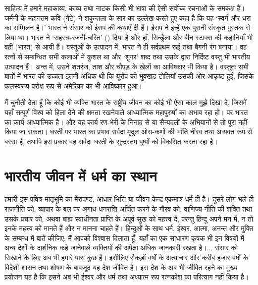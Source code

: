 साहित्य में हमारे महाकाव्य, काव्य तथा नाटक किसी भी भाषा की ऐसी सर्वोच्च रचनाओं के समकक्ष हैं। जर्मनी के महानतम कवि (गेटे) ने शकुन्तला के सार का उल्लेख करते हुए कहा है कि यह ‘स्वर्ग और धरा का सम्मिलन है।’ भारत ने संसार को ईसप की कथाएँ दी हैं। ईसप ने इन्हें एक पुरानी संस्कृत पुस्तक से लिया था। भारत ने ‘सहस्त्र-रजनी-चरित’ () दिया है और हाँ, सिन्ड्रैला और बीन स्टाक्स की कहानियाँ भी वहीं (भारत) से आयी हैं। वस्तुओं के उत्पादन में, भारत ने ही सर्वप्रथम रूई तथा बैगनी रंग बनाया। वह रत्नों से सम्बन्धित सभी कलाओं में कुशल था और ‘शुगर’ शब्द तथा उसके द्वारा निर्दिष्ट वस्तु भी भारतीय उत्पादन हैं। अन्त में, उसने शतरंज, ताश और चौपड़ के खेलों का आविष्कार भी किया है। वस्तुतः सभी बातों में भारत की उच्चता इतनी अधिक थी कि यूरोप की भुक्खड़ टोलियाँ उसकी ओर आकृष्ट हुईं, जिसके फलस्वरूप परोक्ष रूप से अमेरिका का भी आविष्कार हुआ। 

मैं चुनौती देता हूँ कि कोई भी व्यक्ति भारत के राष्ट्रीय जीवन का कोई भी ऐसा काल मुझे दिखा दे, जिसमें यहाँ सम्पूर्ण विश्व को हिला देने की क्षमता रखनेवाले आध्यात्मिक महापुरुषों का अभाव रहा हो। पर भारत का कार्य आध्यात्मिक है। और यह कार्य रण-भेरी के निनाद से या सैन्यदलों के अभियानों से तो पूरा नहीं किया जा सकता। धरती पर भारत का प्रभाव सर्वदा मृदुल ओस-कणों की भाँति नीरव तथा अव्यक्त रूप से बरसा है, तथापि इस प्रकार वह सर्वदा धरती के सुन्दरतम पुष्पों को विकसित करता रहा है।


\section*{भारतीय जीवन में धर्म का स्थान}


हमारी इस पवित्र मातृभूमि का मेरुदण्ड, आधार-भित्ति या जीवन-केन्द्र एकमात्र धर्म ही है। दूसरे लोग भले ही राजनीति को, व्यापार के बल पर अगाध धनराशि अर्जित करने के गौरव को, वाणिज्य-नीति की शक्ति तथा उसके प्रचार को, अथवा बाह्य स्वाधीनता प्राप्ति के अपूर्व सुख को महत्त्व दें, परन्तु हिन्दू अपने मन में, न तो इनके महत्त्व को मानते हैं और न मानना चाहते हैं। हिन्दुओं के साथ धर्म, ईश्वर, आत्मा, अनन्त और मुक्ति के सम्बन्ध में बातें कीजिए; मैं आपको विश्वास दिलाता हूँ, यहाँ का एक साधारण कृषक भी इन विषयों में अन्य देशों के दार्शनिक कहे जानेवाले व्यक्तियों की अपेक्षा अधिक जानकारी रखता है।... संसार को सिखाने के लिए अब भी हमारे पास कुछ है। इसीलिए सैकड़ों वर्षों के अत्याचार और करीब हजार वर्षों के विदेशी शासन तथा शोषण के बावजूद यह देश जीवित है। इस देश के अब भी जीवित रहने का मुख्य प्रयोजन यह है कि इसने अब भी ईश्वर और धर्म तथा अध्यात्म रूप रत्नकोश का परित्याग नहीं किया है। 

